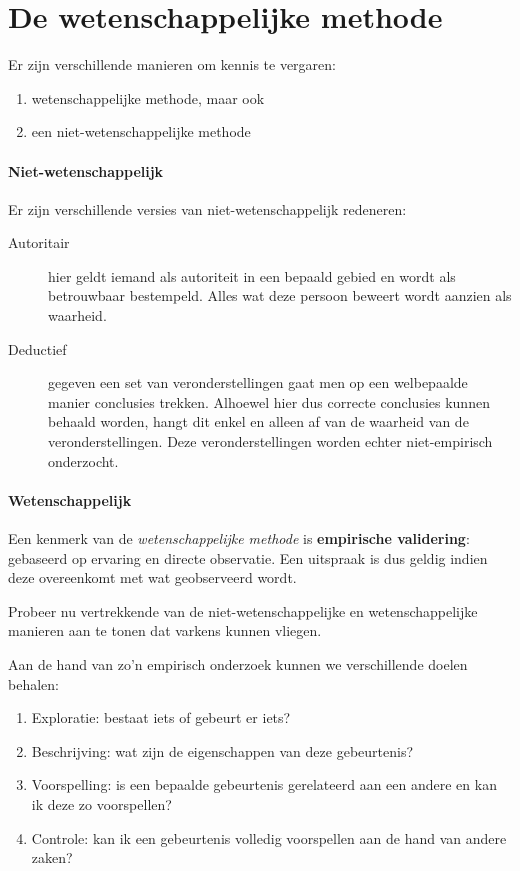 \section{De wetenschappelijke methode}
\label{sec:onderzoeksproces-wetenschappelijke-methode}

Er zijn verschillende manieren om kennis te vergaren:

\begin{enumerate}
  \item wetenschappelijke methode, maar ook 
  \item een niet-wetenschappelijke methode
\end{enumerate}

\paragraph{Niet-wetenschappelijk}Er zijn verschillende versies van niet-wetenschappelijk redeneren: 
\begin{description}
  \item [Autoritair] hier geldt iemand als autoriteit in een bepaald gebied en wordt als betrouwbaar bestempeld. Alles wat deze persoon beweert wordt aanzien als waarheid. 
  \item [Deductief] gegeven een set van veronderstellingen gaat men op een welbepaalde manier conclusies trekken. Alhoewel hier dus correcte conclusies kunnen behaald worden, hangt dit enkel en alleen af van de waarheid van de veronderstellingen. Deze veronderstellingen worden echter niet-empirisch onderzocht.
\end{description}

\paragraph{Wetenschappelijk}
Een kenmerk van de \textsl{wetenschappelijke methode} is \textbf{empirische validering}: gebaseerd op ervaring en directe observatie. Een uitspraak is dus geldig indien deze overeenkomt met wat geobserveerd wordt.

\begin{exercise}
Probeer nu vertrekkende van de niet-wetenschappelijke en wetenschappelijke manieren aan te tonen dat varkens kunnen vliegen. 
\end{exercise}

Aan de hand van zo'n empirisch onderzoek kunnen we verschillende doelen behalen:
\begin{enumerate}
  \item Exploratie: bestaat iets of gebeurt er iets?
  \item Beschrijving: wat zijn de eigenschappen van deze gebeurtenis?
  \item Voorspelling: is een bepaalde gebeurtenis gerelateerd aan een andere en kan ik deze zo voorspellen?
  \item Controle: kan ik een gebeurtenis volledig voorspellen aan de hand van andere zaken?
\end{enumerate}


